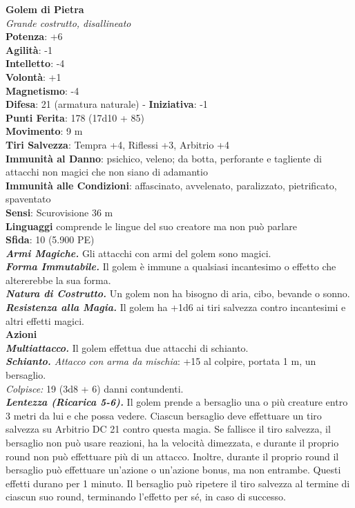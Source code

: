\begin{multicols}{2}
\medskip\textbf{Golem di Pietra}\\
\emph{Grande costrutto, disallineato}\\
\textbf{Potenza}: +6 \\
\textbf{Agilità}: -1\\
\textbf{Intelletto}: -4\\
\textbf{Volontà}: +1\\
\textbf{Magnetismo}: -4\\
\textbf{Difesa}: 21 (armatura naturale) - \textbf{Iniziativa}: -1\\
\textbf{Punti Ferita}: 178 (17d10 + 85)\\
\textbf{Movimento}: 9 m\\
\textbf{Tiri Salvezza}: Tempra +4, Riflessi +3, Arbitrio +4\\
\textbf{Immunità al Danno}: psichico, veleno; da botta, perforante e tagliente di attacchi non magici che non siano di adamantio\\
\textbf{Immunità alle Condizioni}: affascinato, avvelenato, paralizzato, pietrificato, spaventato\\
\textbf{Sensi}: Scurovisione 36 m\\
\textbf{Linguaggi} comprende le lingue del suo creatore ma non può parlare\\
\textbf{Sfida}: 10 (5.900 PE)\smallskip\\
\emph{\textbf{Armi Magiche.}} Gli attacchi con armi del golem sono magici.\\
\emph{\textbf{Forma Immutabile.}} Il golem è immune a qualsiasi incantesimo o effetto che altererebbe la sua forma.\\
\emph{\textbf{Natura di Costrutto.}} Un golem non ha bisogno di aria, cibo, bevande o sonno.\\
\emph{\textbf{Resistenza alla Magia.}} Il golem ha +1d6 ai tiri salvezza contro incantesimi e altri effetti magici.\\
\smallskip\textbf{Azioni} \\
\emph{\textbf{Multiattacco.}} Il golem effettua due attacchi di schianto.\\
\emph{\textbf{Schianto.} Attacco con arma da mischia}: +15 al colpire, portata 1 m, un bersaglio.\\
\emph{Colpisce:} 19 (3d8 + 6) danni contundenti.\\
\emph{\textbf{Lentezza (Ricarica 5-6).}} Il golem prende a bersaglio una o più creature entro 3 metri da lui e che possa vedere. Ciascun bersaglio deve effettuare un tiro salvezza su Arbitrio DC  21 contro questa magia. Se fallisce il tiro salvezza, il bersaglio non può usare reazioni, ha la velocità dimezzata, e durante il proprio round non può effettuare più di un attacco. Inoltre,  durante il proprio round il bersaglio può effettuare un'azione o un'azione bonus, ma non entrambe. Questi effetti durano per 1 minuto. Il bersaglio può ripetere il tiro salvezza al termine di ciascun suo round, terminando l'effetto per sé, in caso di successo.\\

\end{multicols}
